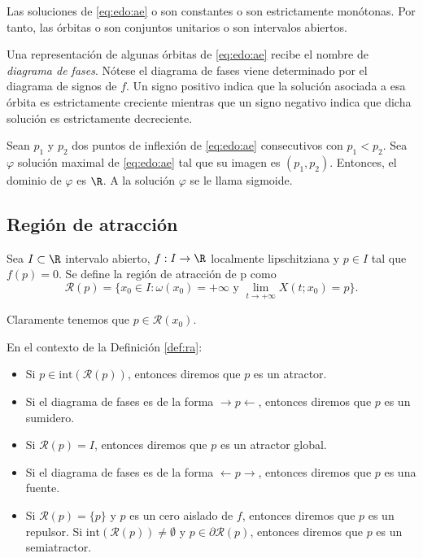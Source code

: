 \documentclass{article}
\begin{document}
\begin{cor}
  Las soluciones de \eqref{eq:edo:ae} o son constantes o son estrictamente monótonas. Por tanto, las
  órbitas o son conjuntos unitarios o son intervalos abiertos.
\end{cor}

Una representación de algunas órbitas de \eqref{eq:edo:ae} recibe el nombre de \emph{diagrama de
  fases}. Nótese el diagrama de fases viene determinado por el diagrama de signos de $f$. Un signo
positivo indica que la solución asociada a esa órbita es estrictamente creciente mientras que un
signo negativo indica que dicha solución es estrictamente decreciente.

\begin{cor}
  Sean $p_1$ y $p_2$ dos puntos de inflexión de \eqref{eq:edo:ae} consecutivos con $p_1 < p_2$. Sea $\varphi$ solución maximal de \eqref{eq:edo:ae} tal que su imagen es $(p_1, p_2)$. Entonces, el dominio de $\varphi$ es $\R$. A la solución $\varphi$ se le llama sigmoide. 
\end{cor}

\begin{definition}
\end{definition}

\subsection{Región de atracción}

\begin{definition}
\label{def:ra}
Sea $I \subset \R$ intervalo abierto, $f: I \to \R$ localmente lipschitziana y $p \in I$ tal que $f(p) = 0$. Se define la región de atracción de p como
\[ \mathcal{R}(p) = \{x_0\in I: \omega(x_0) = +\infty \text{ y } \lim_{t \to +\infty} X(t;x_0) = p\}. \]
\end{definition}

Claramente tenemos que $p \in \mathcal{R}(x_0)$.

\begin{definition}
\label{def:atractor}
En el contexto de la Definición \ref{def:ra}:
\begin{itemize}
\item Si $p \in \mathrm{int}(\mathcal{R}(p))$, entonces diremos que $p$ es un atractor.
\item Si el diagrama de fases es de la forma $\rightarrow p \leftarrow$, entonces diremos que $p$ es un sumidero.
\item Si $\mathcal{R}(p) = I$, entonces diremos que $p$ es un atractor global.
\item Si el diagrama de fases es de la forma $\leftarrow p \rightarrow$, entonces diremos que $p$ es una fuente.
\item Si $\mathcal{R}(p) = \{p\}$ y $p$ es un cero aislado de $f$, entonces diremos que $p$ es un repulsor.
Si $\mathrm{int}(\mathcal{R}(p)) \ne \emptyset$ y $p \in \partial \mathcal{R}(p)$, entonces diremos que $p$ es un semiatractor.
\end{itemize}
\end{definition}
\end{document}
